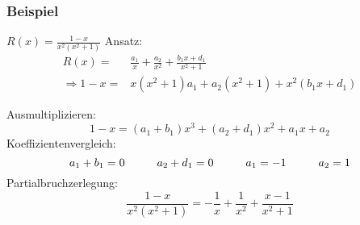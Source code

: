 \subsubsection{Beispiel}
$R(x)=\frac{1-x}{x^2(x^2+1)}$
Ansatz:
\begin{align*}
R(x)=&\frac{a_1}{x}+\frac{a_2}{x^2}+\frac{b_1x+d_1}{x^2+1}\\
\Rightarrow 1-x= &x(x^2+1)a_1+a_2(x^2+1)+x^2(b_1x+d_1)
\end{align*}

Ausmultiplizieren:
\[1-x=(a_1+b_1)x^3+(a_2+d_1)x^2+a_1x+a_2\]
Koeffizientenvergleich:
\[a_1+b_1=0\text{\hspace{10mm}}a_2+d_1=0\text{\hspace{10mm}}a_1=-1\text{\hspace{10mm}}a_2=1\]
Partialbruchzerlegung:
\[\frac{1-x}{x^2(x^2+1)}=-\frac{1}{x}+\frac{1}{x^2}+\frac{x-1}{x^2+1}\]
